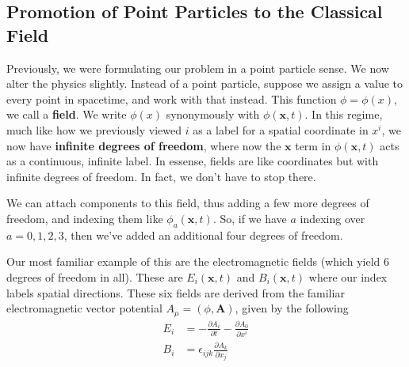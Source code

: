 \subsection{Promotion of Point Particles to the Classical Field} 
Previously, we were formulating our problem in a point particle sense. We now alter the physics slightly. Instead of a point particle, suppose we assign a value to every point in spacetime, and work with that instead. This function $\phi = \phi(x) $, we call a \textbf{field}. We write $\phi( x)$ synonymously with $\phi ( \mathbf{x} , t) $. In this regime, much like how we previously viewed $i$ as a label for a spatial coordinate in $x^i$, we now have 
\textbf{infinite degrees of freedom}, where now the $\mathbf{x}$ term in $\phi( \mathbf{x}, t)$ acts as a continuous, infinite label. In essense, fields are like coordinates but with infinite degrees of freedom. In fact, we don't have to stop there. 

We can attach components to this field, thus adding a few more degrees of freedom, and indexing them like $\phi_a ( \mathbf{x}, t)$. So, if we have $a$ indexing over $a =0, 1, 2, 3$, then we've added an additional four degrees of freedom. 

Our most familiar example of this are the electromagnetic fields (which yield 6 degrees of freedom in all). These are $E_i( \mathbf{x}, t)$ and $B_i( \mathbf{ x}, t)$ where our index labels spatial directions. These six fields are derived from the familiar electromagnetic vector potential $A_\mu  = (\phi, \mathbf{A} ) $, given by the following 
\begin{align*}
E_i &=  - \frac{ \partial A_i }{ \partial t }  - \frac{ \partial A_0 }{ \partial x^i} \\
B_i & = \epsilon_{ ijk } \frac{ \partial A_k}{ \partial x_j } 
\end{align*} 


